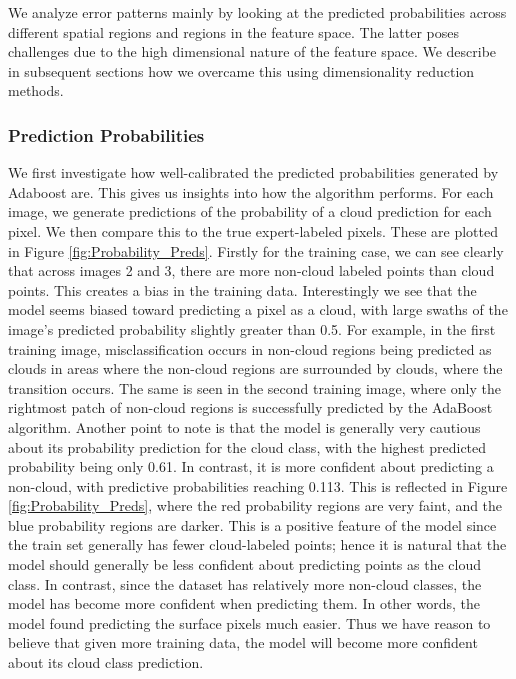 \documentclass[11pt, letterpaper, journal]{IEEEtran}
\begin{document}
We analyze error patterns mainly by looking at the predicted probabilities across different spatial regions and regions in the feature space. The latter poses challenges due to the high dimensional nature of the feature space. We describe in subsequent sections how we overcame this using dimensionality reduction methods.

\subsubsection{Prediction Probabilities}
We first investigate how well-calibrated the predicted probabilities generated by Adaboost are. This gives us insights into how the algorithm performs. For each image, we generate predictions of the probability of a cloud prediction for each pixel. We then compare this to the true expert-labeled pixels. These are plotted in Figure \ref{fig:Probability_Preds}. Firstly for the training case, we can see clearly that across images 2 and 3, there are more non-cloud labeled points than cloud points. This creates a bias in the training data. Interestingly we see that the model seems biased toward predicting a pixel as a cloud, with large swaths of the image's predicted probability slightly greater than 0.5. For example, in the first training image, misclassification occurs in non-cloud regions being predicted as clouds in areas where the non-cloud regions are surrounded by clouds, where the transition occurs. The same is seen in the second training image, where only the rightmost patch of non-cloud regions is successfully predicted by the AdaBoost algorithm. Another point to note is that the model is generally very cautious about its probability prediction for the cloud class, with the highest predicted probability being only 0.61. In contrast, it is more confident about predicting a non-cloud, with predictive probabilities reaching 0.113. This is reflected in Figure \ref{fig:Probability_Preds}, where the red probability regions are very faint, and the blue probability regions are darker. This is a positive feature of the model since the train set generally has fewer cloud-labeled points; hence it is natural that the model should generally be less confident about predicting points as the cloud class. In contrast, since the dataset has relatively more non-cloud classes, the model has become more confident when predicting them. In other words, the model found predicting the surface pixels much easier. Thus we have reason to believe that given more training data, the model will become more confident about its cloud class prediction.
\end{document}
